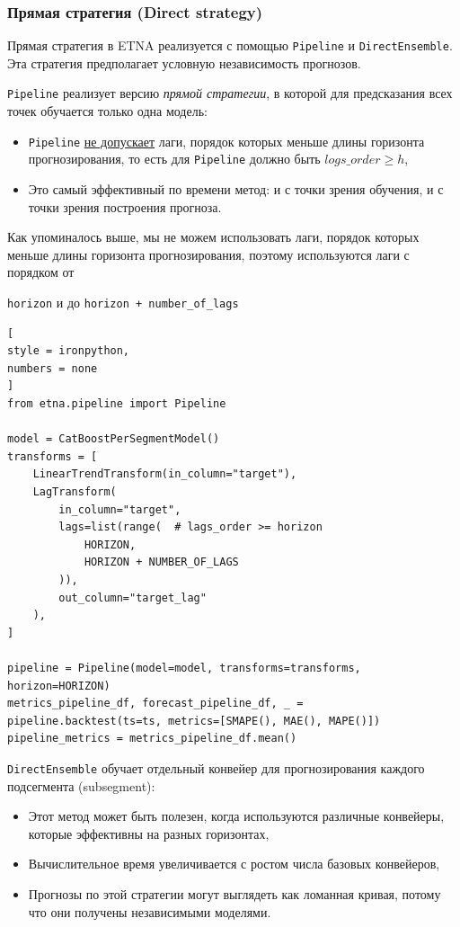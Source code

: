 \documentclass[%
	11pt,
	a4paper,
	utf8,
		]{article}
\begin{document}
\subsubsection{Прямая стратегия (Direct strategy)}

Прямая стратегия в ETNA реализуется с помощью \verb|Pipeline| и \verb|DirectEnsemble|. Эта стратегия предполагает условную независимость прогнозов.

\verb|Pipeline| реализует версию \emph{прямой стратегии}, в которой для предсказания всех точек обучается только одна модель:
\begin{itemize}
	\item {\color{red}\verb|Pipeline| \underline{не допускает} лаги, порядок которых меньше длины горизонта прогнозирования, то есть для \verb|Pipeline| должно быть $ logs\_order \geqslant h $},
	
	\item Это самый эффективный по времени метод: и с точки зрения обучения, и с точки зрения построения прогноза.
\end{itemize}

Как упоминалось выше, мы не можем использовать лаги, порядок которых меньше длины горизонта прогнозирования, поэтому используются лаги с порядком от

\verb|horizon| и до \verb|horizon + number_of_lags|
\begin{lstlisting}[
style = ironpython,
numbers = none
]
from etna.pipeline import Pipeline

model = CatBoostPerSegmentModel()
transforms = [
	LinearTrendTransform(in_column="target"),
	LagTransform(
		in_column="target",
		lags=list(range(  # lags_order >= horizon
			HORIZON,
			HORIZON + NUMBER_OF_LAGS
		)),
		out_column="target_lag"
	),
]

pipeline = Pipeline(model=model, transforms=transforms, horizon=HORIZON)
metrics_pipeline_df, forecast_pipeline_df, _ = pipeline.backtest(ts=ts, metrics=[SMAPE(), MAE(), MAPE()])
pipeline_metrics = metrics_pipeline_df.mean()
\end{lstlisting}

\verb|DirectEnsemble| обучает отдельный конвейер для прогнозирования каждого подсегмента (subsegment):
\begin{itemize}
	\item Этот метод может быть полезен, когда используются различные конвейеры, которые эффективны на разных горизонтах,
	
	\item Вычислительное время увеличивается с ростом числа базовых конвейеров,
	
	\item Прогнозы по этой стратегии могут выглядеть как ломанная кривая, потому что они получены независимыми моделями.
\end{itemize}
\end{document}
